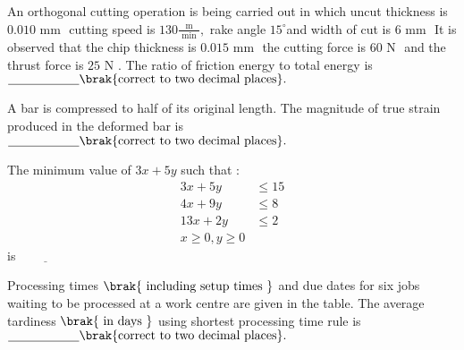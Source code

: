 \bigskip
\item An orthogonal cutting operation is being carried out in which uncut thickness is $0.010\text{ mm }$ cutting speed is $130\frac{\text{ m }}{\text{ min }},$ rake angle $15^{\circ}$and width of cut is $6\text{ mm }$  It is observed that
the chip thickness is $0.015\text{ mm }$ the cutting force is $60\text{ N }$ and the thrust force is $25\text{ N }.$  The ratio of friction energy to total energy is $\underline{\hspace{2cm}} \brak{\text{correct to two decimal places}}.$ 
\bigskip
\item A bar is compressed to half of its original length. The magnitude of true strain produced in the deformed bar is $\underline{\hspace{2cm}} \brak{\text{correct to two decimal places}}.$
\bigskip
\item The minimum value of $3x+5y$ such that :
\begin{align*}
3x + 5y &\leq 15 \\
4x + 9y &\leq 8 \\
13x + 2y &\leq 2 \\
x \geq 0, y \geq 0
\end{align*}
is$\underline{\hspace{2cm}}$
\bigskip
\item Processing times $\brak{\text{ including setup times }}$  and due dates for six jobs waiting to be processed at a work centre are given in the table. The average tardiness $\brak{\text{ in days }}$ using shortest processing time rule is $\underline{\hspace{2cm}} \brak{\text{correct to two decimal places}}.$ 
\begin{figure}[H]
\centering
{}%
\end{figure}

